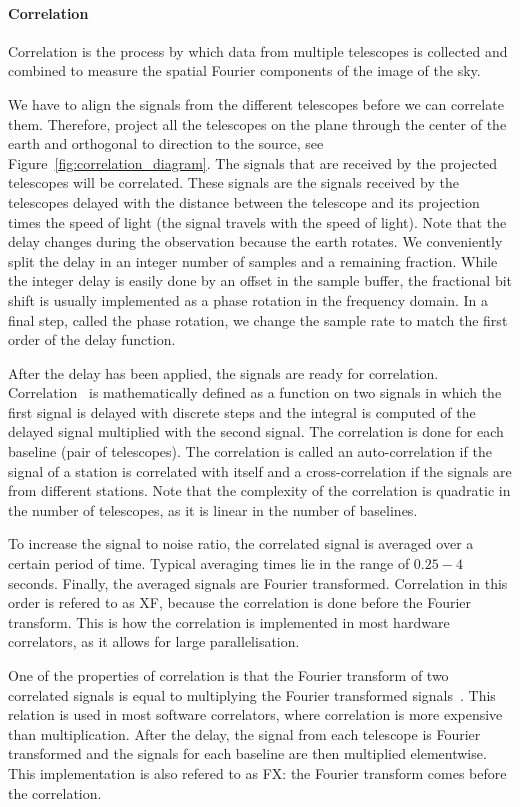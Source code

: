 \paragraph{Correlation}
Correlation is the process by which data from multiple telescopes is
collected and combined to measure the spatial Fourier components of
the image of the sky. 

We have to align the signals from the different telescopes before we
can correlate them. Therefore, project all the telescopes on the plane
through the center of the earth and orthogonal to direction to the
source, see Figure~\ref{fig:correlation_diagram}. The signals that are
received by the projected telescopes will be correlated. These signals
are the signals received by the telescopes delayed with the distance
between the telescope and its projection times the speed of light (the
signal travels with the speed of light). Note that the delay changes
during the observation because the earth rotates. We conveniently
split the delay in an integer number of samples and a remaining
fraction. While the integer delay is easily done by an offset in the
sample buffer, the fractional bit shift is usually implemented as a
phase rotation in the frequency domain. In a final step, called the
phase rotation, we change the sample rate to match the first order of
the delay function.

After the delay has been applied, the signals are ready for
correlation. Correlation~\cite{def_correlation} is mathematically
defined as a function on two signals in which the first signal is
delayed with discrete steps and the integral is computed of the
delayed signal multiplied with the second signal. The correlation is
done for each baseline (pair of telescopes). The correlation is called
an auto-correlation if the signal of a station is correlated with
itself and a cross-correlation if the signals are from different
stations. Note that the complexity of the correlation is quadratic in
the number of telescopes, as it is linear in the number of baselines.

To increase the signal to noise ratio, the correlated signal is
averaged over a certain period of time. Typical averaging times lie in
the range of $0.25-4$ seconds. Finally, the averaged signals are
Fourier transformed. Correlation in this order is refered to as XF,
because the correlation is done before the Fourier transform.  This is
how the correlation is implemented in most hardware correlators, as it
allows for large parallelisation.

One of the properties of correlation is that the Fourier transform of
two correlated signals is equal to multiplying the Fourier transformed
signals~\cite{corr_theorem}. This relation is used in most software
correlators, where correlation is more expensive than multiplication.
After the delay, the signal from each telescope is Fourier transformed
and the signals for each baseline are then multiplied elementwise.
This implementation is also refered to as FX: the Fourier transform comes
before the correlation.

